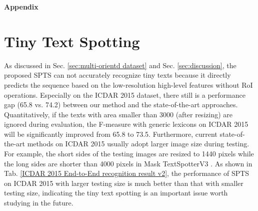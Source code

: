 \documentclass[sigconf]{acmart}
\begin{document}

\balance


\clearpage
{}
\balance
\appendix
\noindent\textbf{\Huge Appendix}
\section{Tiny Text Spotting}
As discussed in Sec. \ref{sec:multi-orientd dataset} and Sec. \ref{sec:discussion}, the proposed SPTS can not accurately recognize tiny texts because it directly predicts the sequence based on the low-resolution high-level features without RoI operations. Especially on the ICDAR 2015 dataset, there still is a performance gap (65.8 vs. 74.2)  between our method and the state-of-the-art approaches. Quantitatively, if the texts with area smaller than 3000 (after resizing) are ignored during evaluation, the F-measure with generic lexicons on ICDAR 2015 will be significantly improved from 65.8 to 73.5. Furthermore, current state-of-the-art methods on ICDAR 2015 usually adopt larger image size during testing. For example, the short sides of the testing images are resized to 1440 pixels while the long sides are shorter than 4000 pixels in Mask TextSpotterV3 \cite{liao2020masktext}. As shown in Tab. \ref{ICDAR 2015 End-to-End recognition result v2}, the performance of SPTS on ICDAR 2015 with larger testing size is much better than that with smaller testing size, indicating the tiny text spotting is an important issue worth studying in the future.
\end{document}
